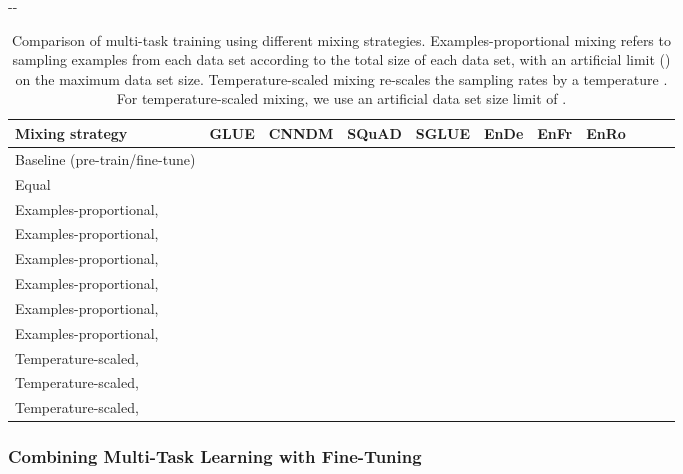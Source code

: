 \documentclass[twoside,11pt]{article}
\newlength{\offsetpage}
\newenvironment{widepage}{\begin{adjustwidth}{-\offsetpage}{-\offsetpage}\addtolength{\textwidth}{2\offsetpage}}{\end{adjustwidth}}
\newcommand{\bsl}{\makebox[0pt][r]{\raisebox{0.05em}{}}}
\begin{document}
\begin{table}
\footnotesize
\begin{widepage}
\centering
\begin{tabular}{l c c c c c c c c c c}
\toprule
    Mixing strategy                     & GLUE        & CNNDM       & SQuAD       & SGLUE       & EnDe        & EnFr        & EnRo    \\
\midrule
    \bsl Baseline (pre-train/fine-tune) &  &  &  &  &  &  &  \\
    Equal                               &      &      &      &      &      &      &  \\
    Examples-proportional,  &      &      &      &      &      &      &  \\
    Examples-proportional,  &      &      &      &      &      &      &  \\
    Examples-proportional,  &      &      &      &      &      &      &  \\
    Examples-proportional,  &      &  &      &      &      &      &  \\
    Examples-proportional,  &      &  &  &      &      &      &  \\
    Examples-proportional,  &      &      &      &      &      &      &  \\
    Temperature-scaled,          &      &  &      &      &      &      &  \\
    Temperature-scaled,          &      &  &      &      &      &      &  \\
    Temperature-scaled,          &      &      &      &      &      &      &  \\
\bottomrule
\end{tabular}
\end{widepage}
\caption{
Comparison of multi-task training using different mixing strategies.
Examples-proportional mixing refers to sampling examples from each data set according to the total size of each data set, with an artificial limit () on the maximum data set size.
Temperature-scaled mixing re-scales the sampling rates by a temperature .
For temperature-scaled mixing, we use an artificial data set size limit of .
}
\label{tab:multitask}
\end{table}

\subsubsection{Combining Multi-Task Learning with Fine-Tuning}
\label{sec:mtft}
\end{document}
